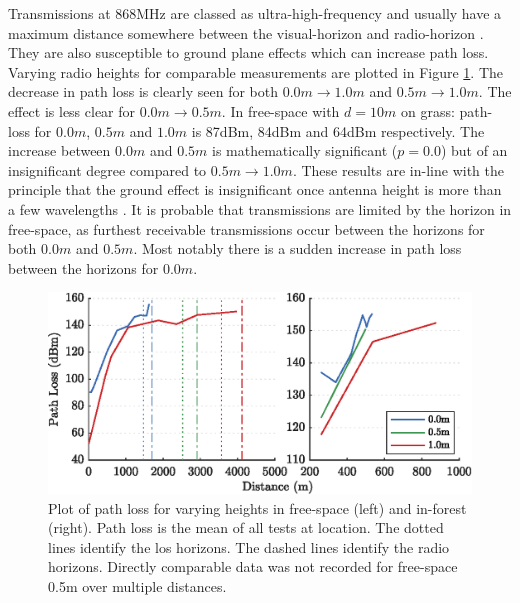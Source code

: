Transmissions at 868MHz are classed as ultra-high-frequency and usually have a maximum distance somewhere between the visual-horizon and radio-horizon \cite{3YP:ANTENNA_BOOK}. They are also susceptible to ground plane effects which can increase path loss. Varying radio heights for comparable measurements are plotted in Figure \ref{fig:height_pl_plot}. The decrease in path loss is clearly seen for both $0.0m\rightarrow 1.0m $ and $0.5m\rightarrow 1.0m$. The effect is less clear for $0.0m\rightarrow 0.5m$. In free-space with $d=10m$ on grass: path-loss for $0.0m$, $0.5m$ and $1.0m$ is 87dBm, 84dBm and 64dBm respectively. The increase between $0.0m$ and $0.5m$ is mathematically significant ($p=0.0$) but of an insignificant degree compared to $0.5m\rightarrow 1.0m$. These results are in-line with the principle that the ground effect is insignificant once antenna height is more than a few wavelengths \cite{3YP:ANTENNA_BOOK}. It is probable that transmissions are limited by the horizon in free-space, as furthest receivable transmissions occur between the horizons for both $0.0m$ and $0.5m$. Most notably there is a sudden increase in path loss between the horizons for $0.0m$.

\begin{figure}[H]
    \centering
   	\includegraphics{Figures/height_pl_plot}
    \caption[Effect of Antenna Height on Path Loss]{
		Plot of path loss for varying heights in free-space (left) and in-forest (right). Path loss is the mean of all tests at location. The dotted lines identify the \ac{los} horizons. The dashed lines identify the radio horizons. Directly comparable data was not recorded for free-space 0.5m over multiple distances.
    }
    \label{fig:height_pl_plot}
\end{figure}